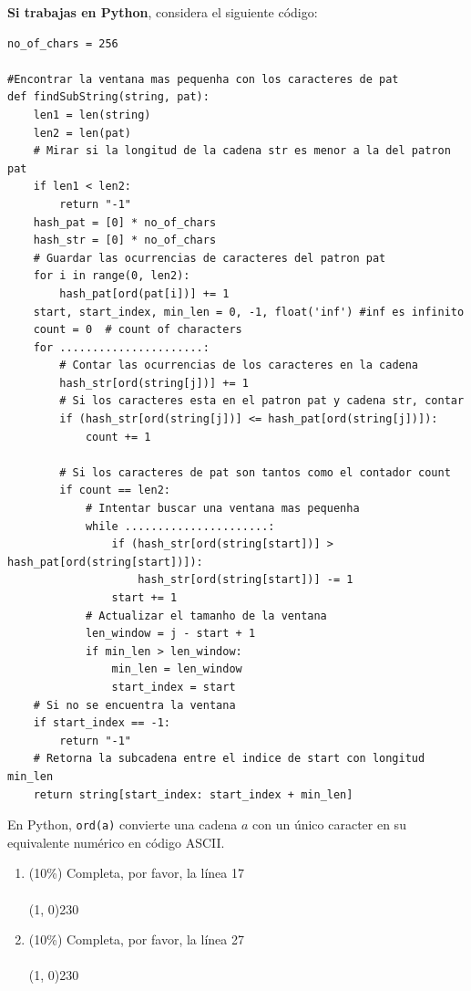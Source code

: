 \documentclass[10 pt]{article}
\begin{document}
\newpage

\textbf{Si trabajas en Python}, considera el siguiente código:

\begin{lstlisting}
no_of_chars = 256

#Encontrar la ventana mas pequenha con los caracteres de pat
def findSubString(string, pat): 
    len1 = len(string)
    len2 = len(pat) 
    # Mirar si la longitud de la cadena str es menor a la del patron pat
    if len1 < len2:         
        return "-1"
    hash_pat = [0] * no_of_chars
    hash_str = [0] * no_of_chars
    # Guardar las ocurrencias de caracteres del patron pat
    for i in range(0, len2):
        hash_pat[ord(pat[i])] += 1 
    start, start_index, min_len = 0, -1, float('inf') #inf es infinito    
    count = 0  # count of characters
    for ......................:
        # Contar las ocurrencias de los caracteres en la cadena 
        hash_str[ord(string[j])] += 1 
        # Si los caracteres esta en el patron pat y cadena str, contar
        if (hash_str[ord(string[j])] <= hash_pat[ord(string[j])]):
            count += 1

        # Si los caracteres de pat son tantos como el contador count 
        if count == len2: 
            # Intentar buscar una ventana mas pequenha
            while ......................:
                if (hash_str[ord(string[start])] > hash_pat[ord(string[start])]):
                    hash_str[ord(string[start])] -= 1
                start += 1
            # Actualizar el tamanho de la ventana 
            len_window = j - start + 1
            if min_len > len_window:
                min_len = len_window
                start_index = start
    # Si no se encuentra la ventana 
    if start_index == -1:        
        return "-1" 
    # Retorna la subcadena entre el indice de start con longitud min_len    
    return string[start_index: start_index + min_len]
\end{lstlisting}

En Python, \texttt{ord(a)} convierte una cadena $a$ con un único caracter en su equivalente numérico en código ASCII.

\begin{enumerate}[label=(\Alph*)]

  \item (10\%) Completa, por favor, la línea 17 \\ \\
   \line(1, 0){230}\\

  \item (10\%) Completa, por favor, la línea 27 \\ \\
   \line(1, 0){230}\\


\end{enumerate}
\end{document}
